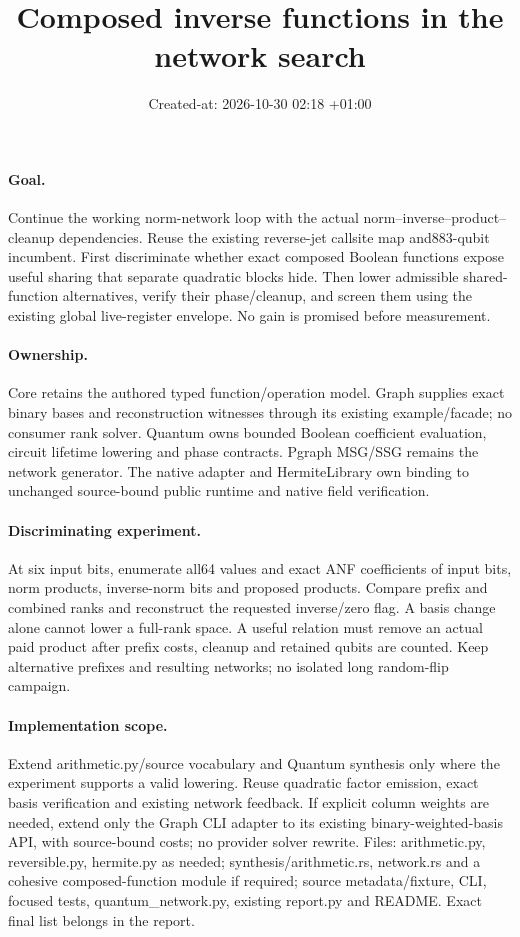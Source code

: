 \documentclass{article}
\title{Composed inverse functions in the network search}
\date{Created-at: 2026-10-30 02:18 +01:00}
\begin{document}
\maketitle
\paragraph{Goal.} Continue the working norm-network loop with the actual
norm--inverse--product--cleanup dependencies. Reuse the existing reverse-jet
callsite map and883-qubit incumbent. First discriminate whether exact composed
Boolean functions expose useful sharing that separate quadratic blocks hide.
Then lower admissible shared-function alternatives, verify their phase/cleanup,
and screen them using the existing global live-register envelope. No gain is
promised before measurement.
\paragraph{Ownership.} Core retains the authored typed function/operation model.
Graph supplies exact binary bases and reconstruction witnesses through its
existing example/facade; no consumer rank solver. Quantum owns bounded Boolean
coefficient evaluation, circuit lifetime lowering and phase contracts. Pgraph
MSG/SSG remains the network generator. The native adapter and HermiteLibrary own
binding to unchanged source-bound public runtime and native field verification.
\paragraph{Discriminating experiment.} At six input bits, enumerate all64
values and exact ANF coefficients of input bits, norm products, inverse-norm
bits and proposed products. Compare prefix and combined ranks and reconstruct
the requested inverse/zero flag. A basis change alone cannot lower a full-rank
space. A useful relation must remove an actual paid product after prefix costs,
cleanup and retained qubits are counted. Keep alternative prefixes and resulting
networks; no isolated long random-flip campaign.
\paragraph{Implementation scope.} Extend arithmetic.py/source vocabulary and
Quantum synthesis only where the experiment supports a valid lowering. Reuse
quadratic factor emission, exact basis verification and existing network feedback.
If explicit column weights are needed, extend only the Graph CLI adapter to its
existing binary-weighted-basis API, with source-bound costs; no provider solver
rewrite. Files: arithmetic.py, reversible.py, hermite.py as needed;
synthesis/arithmetic.rs, network.rs and a cohesive composed-function module if
required; source metadata/fixture, CLI, focused tests, quantum\_network.py,
existing report.py and README. Exact final list belongs in the report.
\end{document}
